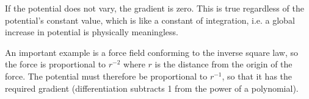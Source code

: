 If the potential does not vary, the gradient is zero. This is true regardless of the potential's constant value, which is like a constant of integration, i.e. a global increase in potential is physically meaningless.

An important example is a force field conforming to the inverse square law, so the force is proportional to $r^{-2}$ where $r$ is the distance from the origin of the force. The potential must therefore be proportional to $r^{-1}$, so that it has the required gradient (differentiation subtracts 1 from the power of a polynomial).

